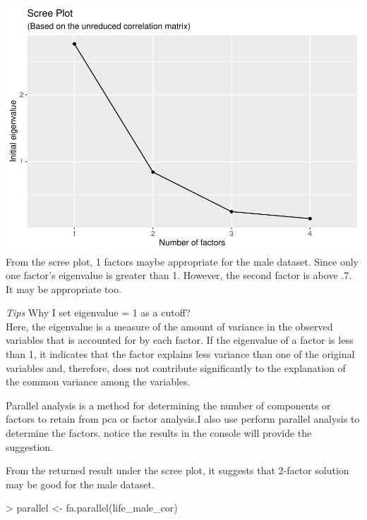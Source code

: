 \documentclass[
]{article}
\newenvironment{Shaded}{\begin{snugshade}}{\end{snugshade}}
\newcommand{\FunctionTok}[1]{\textcolor[rgb]{0.00,0.00,0.00}{#1}}
\newcommand{\NormalTok}[1]{#1}
\newcommand{\OtherTok}[1]{\textcolor[rgb]{0.56,0.35,0.01}{#1}}
\newcommand{\SpecialCharTok}[1]{\textcolor[rgb]{0.00,0.00,0.00}{#1}}
\begin{document}
\includegraphics{HUDM6122-Homework_05-Chenguang-Pan_files/figure-latex/unnamed-chunk-6-1.pdf}
From the scree plot, 1 factors maybe appropriate for the male dataset.
Since only one factor's eigenvalue is greater than 1. However, the
second factor is above .7. It may be appropriate too.

\emph{Tips} Why I set eigenvalue = 1 as a cutoff?\\
Here, the eigenvalue is a measure of the amount of variance in the
observed variables that is accounted for by each factor. If the
eigenvalue of a factor is less than 1, it indicates that the factor
explains less variance than one of the original variables and,
therefore, does not contribute significantly to the explanation of the
common variance among the variables.

Parallel analysis is a method for determining the number of components
or factors to retain from pca or factor analysis.I also use perform
parallel analysis to determine the factors. notice the results in the
console will provide the suggestion.

From the returned result under the scree plot, it suggests that 2-factor
solution may be good for the male dataset.

\begin{Shaded}
\begin{Highlighting}[]
\SpecialCharTok{\textgreater{}}\NormalTok{ parallel }\OtherTok{\textless{}{-}} \FunctionTok{fa.parallel}\NormalTok{(life\_male\_cor)}
\end{Highlighting}
\end{Shaded}
\end{document}
